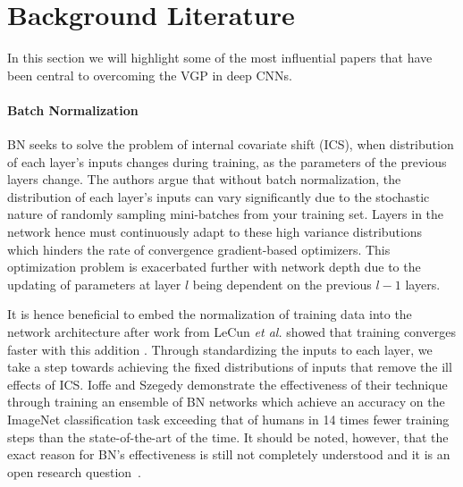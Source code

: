 \documentclass{article}
\begin{document}
\section{Background Literature}
\label{sec:lit_rev}
In this section we will highlight some of the most influential
papers that have been central to overcoming the VGP in
deep CNNs.

\paragraph{Batch Normalization}\cite{ioffe2015batch}
BN seeks to solve the  problem of 
internal covariate shift (ICS), when distribution of each layer’s 
inputs changes during training, as the parameters of the previous layers change. 
The authors
argue that without batch normalization, the distribution of
each layer’s inputs can vary significantly due to the 
stochastic nature of randomly sampling mini-batches from your
training set. Layers in the network hence must continuously
adapt to these high variance distributions which hinders the
rate of convergence gradient-based optimizers. This optimization
problem is exacerbated further with network depth due
to the updating of parameters at layer $l$ being dependent on
the previous $l-1$ layers.

It is hence beneficial to embed the normalization of
training data into the network architecture after work from
LeCun \emph{et al.} showed that training converges faster with
this addition \cite{lecun2012efficient}. Through standardizing
the inputs to each layer, we take a step towards achieving
the fixed distributions of inputs that remove the ill effects
of ICS. Ioffe and Szegedy demonstrate the effectiveness of
their technique through training an ensemble of BN
networks which achieve an accuracy on the ImageNet classification
task exceeding that of humans in 14 times fewer
training steps than the state-of-the-art of the time.
It should be noted, however, that the exact reason for
BN’s effectiveness is still not completely understood and it is 
an open research question~\cite{santurkar2018does}.
\end{document}
